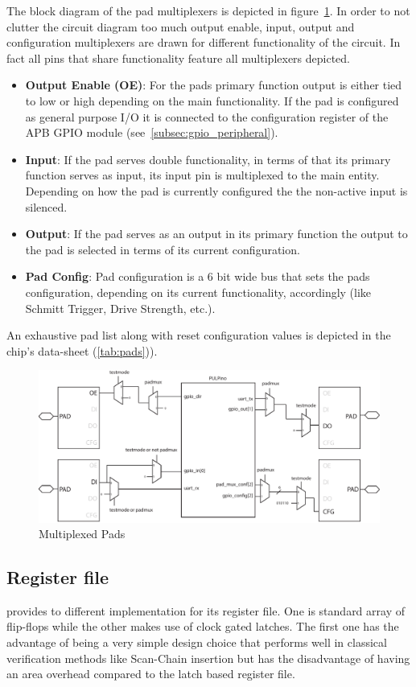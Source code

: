 The block diagram of the pad multiplexers is depicted in figure~\ref{fig:pad_muxes}. In order to not clutter the circuit diagram too much output enable, input, output and configuration multiplexers are drawn for different functionality of the circuit. In fact all pins that share functionality feature all multiplexers depicted.
\begin{itemize}
    \item \textbf{Output Enable (OE)}: For the pads primary function output is either tied to low or high depending on the main functionality. If the pad is configured as general purpose I/O it is connected to the configuration register of the APB GPIO module (see~\ref{subsec:gpio_peripheral}).
    \item \textbf{Input}: If the pad serves double functionality, in terms of that its primary function serves as input, its input pin is multiplexed to the main entity. Depending on how the pad is currently configured the the non-active input is silenced.
    \item \textbf{Output}: If the pad serves as an output in its primary function the output to the pad is selected in terms of its current configuration.
    \item \textbf{Pad Config}: Pad configuration is a 6 bit wide bus that sets the pads configuration, depending on its current functionality, accordingly (like Schmitt Trigger, Drive Strength, etc.).
\end{itemize}
An exhaustive pad list along with reset configuration values is depicted in the chip's data-sheet (\ref{tab:pads})).


\begin{figure}[tbh]
  \centering
  \includegraphics[width=\linewidth]{./figures/pad_muxes}
  \caption{Multiplexed Pads}
  \label{fig:pad_muxes}
\end{figure}

\subsection{Register file}
\pulpino provides to different implementation for its register file. One is standard array of flip-flops while the other makes use of clock gated latches. The first one has the advantage of being a very simple design choice that performs well in classical verification methods like Scan-Chain insertion but has the disadvantage of having an area overhead compared to the latch based register file.


